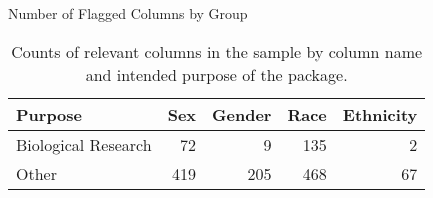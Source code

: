 \begin{table}[ht]
\centering
\caption{Number of Flagged Columns by Group} 
\begin{tabular}{|l|rrrr|}
   \hline
 Purpose & Sex & Gender & Race & Ethnicity \\ 
   \hline
Biological Research &  72 &   9 & 135 &   2 \\ 
   \hline
Other & 419 & 205 & 468 &  67 \\
   \hline
  \end{tabular}
  \captionsetup{width=0.8\textwidth}
  \vspace{10pt}
  \caption*{Counts of relevant columns in the sample by column name and intended purpose of the package.}
\label{tab:n_columns_by_grp}
\end{table}

